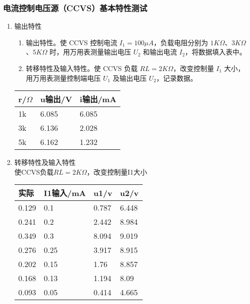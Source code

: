 \documentclass[dvipsnames, svgnames,a4paper,11pt]{article}
\begin{document}
					\subsubsection{电流控制电压源（CCVS）基本特性测试}
				\begin{enumerate}
					
					\item 输出特性
					\begin{enumerate}
						\item 输出特性。使 CCVS 控制电流 \(I_1=100\mu A\)，负载电阻分别为 \(1K\Omega\)、\(3K\Omega\)、\(5K\Omega\) 时，用万用表测量输出电压 \(U_2\) 和输出电流 \(I_2\)，将数据填入表中。
						\item 转移特性及输入特性。使 CCVS 负载 \(RL = 2K\Omega\)，改变控制量 \(I_1\) 大小，用万用表测量控制端电压 \(U_1\) 及输出电压 \(U_2\)，记录数据。
					\end{enumerate}
				\begin{table}[htbp]
					\centering
					\begin{tabular}{|l|l|l|}
						\hline
						r/$\Omega $ & u输出/V & i输出/mA  \\ \hline
						1k & 6.085 & 6.085  \\ \hline
						3k & 6.136 & 2.028  \\ \hline
						5k & 6.162 & 1.232  \\ \hline
					\end{tabular}
				\end{table}
				\item 转移特性及输入特性\\
				使CCVS负载$RL=2K\Omega $，改变控制量I1大小
				\begin{table}[htbp]
					\centering
					\begin{tabular}{|l|l|l|l|}
						\hline
						实际 & I1输入/mA & u1/v & u2/v  \\ \hline
						0.129 & 0.1 & 0.787 & 6.448  \\ \hline
						0.241 & 0.2 & 2.442 & 8.984  \\ \hline
						0.349 & 0.3 & 8.094 & 9.019  \\ \hline
						0.276 & 0.25 & 3.917 & 8.915  \\ \hline
						0.202 & 0.15 & 1.76 & 8.857  \\ \hline
						0.168 & 0.13 & 1.194 & 8.09  \\ \hline
						0.093 & 0.05 & 0.414 & 4.665  \\ \hline
					\end{tabular}
				\end{table}
			
         	\end{enumerate}
	
\end{document}

